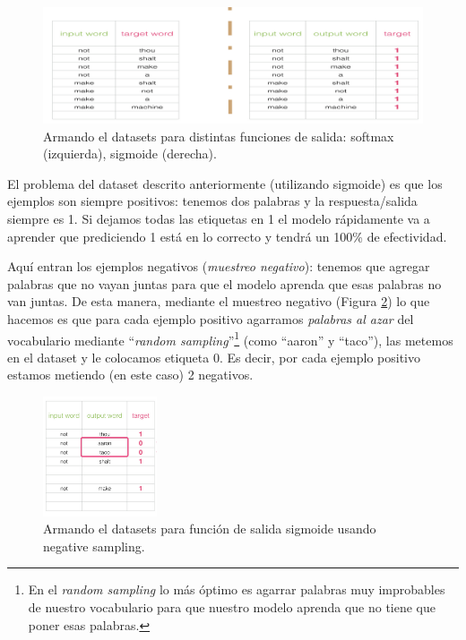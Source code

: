 \documentclass[12pt,a4paper]{article}
\begin{document}
\begin{sloppypar}
\begin{figure}[H]    
 \centering
 \includegraphics[width=1\textwidth]{images/NLP/25.png}
 \captionsetup{justification=centering,margin=2cm}
 \caption{Armando el datasets para distintas funciones de salida: softmax (izquierda), sigmoide (derecha)\cite{datitos_nlp}.}
 \label{fig:Imagen_NLP_25}
\end{figure}

El problema del dataset descrito anteriormente (utilizando sigmoide) es que los ejemplos son siempre positivos: tenemos dos palabras y la respuesta/salida siempre es 1. Si dejamos todas las etiquetas en 1 el modelo rápidamente va a aprender que prediciendo 1 está en lo correcto y tendrá un 100\% de efectividad. 

Aquí entran los ejemplos negativos (\textit{muestreo negativo}): tenemos que agregar palabras que no vayan juntas para que el modelo aprenda que esas palabras no van juntas. De esta manera, mediante el muestreo negativo (Figura \ref{fig:Imagen_NLP_26}) lo que hacemos es que para cada ejemplo positivo agarramos \textit{palabras al azar} del vocabulario mediante “\textit{random sampling}”\footnote{En el \textit{random sampling} lo más óptimo es agarrar palabras muy improbables de nuestro vocabulario para que nuestro modelo aprenda que no tiene que poner esas palabras.} (como “aaron” y “taco”), las metemos en el dataset y le colocamos etiqueta 0. Es decir, por cada ejemplo positivo estamos metiendo (en este caso) 2 negativos. 

\begin{figure}[H]    
 \centering
 \includegraphics[width=0.3\textwidth]{images/NLP/26.png}
 \captionsetup{justification=centering,margin=3cm}
 \caption{Armando el datasets para función de salida sigmoide usando negative sampling\cite{datitos_nlp}.}
 \label{fig:Imagen_NLP_26}
\end{figure}


\end{sloppypar}
\end{document}
